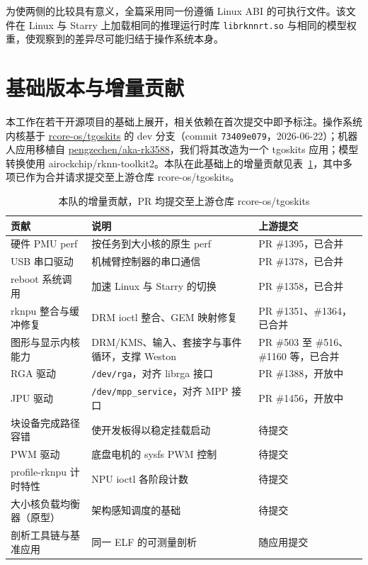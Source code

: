 \documentclass[11pt,a4paper]{ctexart}
\newcommand{\hdr}[1]{\textsf{\bfseries\color{ink}#1}}
\newcommand{\headrow}{\rowcolor{tinthdr}}
\begin{document}
为使两侧的比较具有意义，全篇采用同一份遵循 Linux ABI 的可执行文件。该文件在 Linux 与 Starry 上加载相同的推理运行时库 \texttt{librknnrt.so} 与相同的模型权重，使观察到的差异尽可能归结于操作系统本身。

%
\section{基础版本与增量贡献}\label{sec:base}

本工作在若干开源项目的基础上展开，相关依赖在首次提交中即予标注。操作系统内核基于 \href{https://github.com/rcore-os/tgoskits}{rcore-os/tgoskits} 的 dev 分支（commit \texttt{73409e079}，2026-06-22）；机器人应用移植自 \href{https://github.com/pengzechen/aka-rk3588}{pengzechen/aka-rk3588}，我们将其改造为一个 tgoskits 应用；模型转换使用 airockchip/rknn-toolkit2。本队在此基础上的增量贡献见表~\ref{tab:contrib}，其中多项已作为合并请求提交至上游仓库 rcore-os/tgoskits。

\begin{table}[H]
\centering
\caption{本队的增量贡献，PR 均提交至上游仓库 rcore-os/tgoskits}\label{tab:contrib}
\begin{tabularx}{\textwidth}{@{}l X l@{}}
\toprule
\headrow \hdr{贡献} & \hdr{说明} & \hdr{上游提交}\\
\midrule
硬件 PMU perf & 按任务到大小核的原生 perf & PR \#1395，已合并\\
USB 串口驱动 & 机械臂控制器的串口通信 & PR \#1378，已合并\\
reboot 系统调用 & 加速 Linux 与 Starry 的切换 & PR \#1358，已合并\\
rknpu 整合与缓冲修复 & DRM ioctl 整合、GEM 映射修复 & PR \#1351、\#1364，已合并\\
图形与显示内核能力 & DRM/KMS、输入、套接字与事件循环，支撑 Weston & PR \#503 至 \#516、\#1160 等，已合并\\
RGA 驱动 & \texttt{/dev/rga}，对齐 librga 接口 & PR \#1388，开放中\\
JPU 驱动 & \texttt{/dev/mpp\_service}，对齐 MPP 接口 & PR \#1456，开放中\\
块设备完成路径容错 & 使开发板得以稳定挂载启动 & 待提交\\
PWM 驱动 & 底盘电机的 sysfs PWM 控制 & 待提交\\
profile-rknpu 计时特性 & NPU ioctl 各阶段计数 & 待提交\\
大小核负载均衡器（原型）& 架构感知调度的基础 & 待提交\\
剖析工具链与基准应用 & 同一 ELF 的可测量剖析 & 随应用提交\\
\bottomrule
\end{tabularx}
\end{table}
\end{document}
